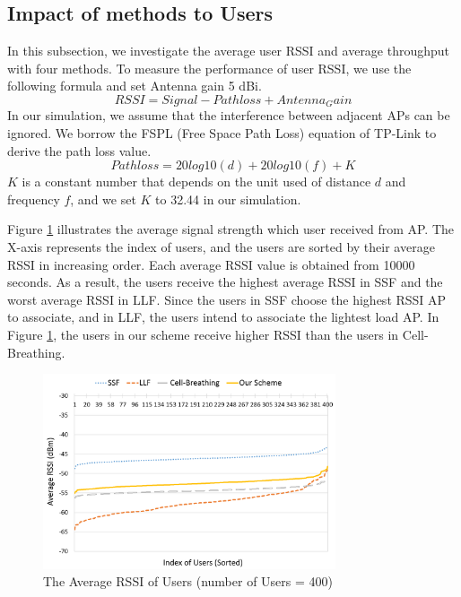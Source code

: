 \subsection{Impact of methods to Users}
In this subsection, we investigate the average user RSSI and average throughput with four methods. To measure the performance of user RSSI, we use the following formula and set Antenna gain 5 dBi.
\begin{equation}\label{RSSI}
  RSSI= Signal - Pathloss + Antenna_Gain
\end{equation}
In our simulation, we assume that the interference between adjacent APs can be ignored. We borrow the FSPL (Free Space Path Loss) equation of TP-Link to derive the path loss value.
\begin{equation}\label{Pathloss}
  Pathloss = 20log10(d)+ 20log10(f) + K
\end{equation}
$K$ is a constant number that depends on the unit used of distance $d$ and frequency $f$, and we set $K$ to 32.44 in our simulation.

Figure \ref{fig:Average-user-rssi} illustrates the average signal strength which user received from AP. The X-axis represents the index of users, and the users are sorted by their average RSSI in increasing order. Each average RSSI value is obtained from 10000 seconds. As a result, the users receive the highest average RSSI in SSF and the worst average RSSI in LLF. Since the users in SSF choose the highest RSSI AP to associate, and in LLF, the users intend to associate the lightest load AP. In Figure \ref{fig:Average-user-rssi}, the users in our scheme receive higher RSSI than the users in Cell-Breathing.

\begin{figure}[tbp]
\begin{center}
\includegraphics[width=3.4in]{images/Average_user_RSSI.png}
\end{center}
\caption{The Average RSSI of Users (number of Users = 400)}
\label{fig:Average-user-rssi}
\end{figure}

